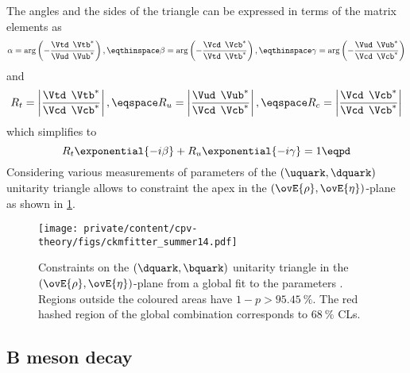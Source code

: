 The angles and the sides of the triangle can be expressed in terms of the matrix
elements as
%
\begin{equation}
  \alpha = \arg\left(-\frac{\Vtd^{\phantom{\ast}}\Vtb^{\ast}}{\Vud^{\phantom{\ast}}\Vub^{\ast}}\right),\eqthinspace 
  \beta =  \arg\left(-\frac{\Vcd^{\phantom{\ast}}\Vcb^{\ast}}{\Vtd^{\phantom{\ast}}\Vtb^{\ast}}\right),\eqthinspace 
  \gamma = \arg\left(-\frac{\Vud^{\phantom{\ast}}\Vub^{\ast}}{\Vcd^{\phantom{\ast}}\Vcb^{\ast}}\right)
\end{equation}
%
and
%
\begin{equation}
  R_t = \left| \frac{\Vtd^{\phantom{\ast}}\Vtb^{\ast}}{\Vcd^{\phantom{\ast}}\Vcb^{\ast}} \right|,\eqspace
  R_u = \left| \frac{\Vud^{\phantom{\ast}}\Vub^{\ast}}{\Vcd^{\phantom{\ast}}\Vcb^{\ast}} \right|,\eqspace
  R_c = \left| \frac{\Vcd^{\phantom{\ast}}\Vcb^{\ast}}{\Vcd^{\phantom{\ast}}\Vcb^{\ast}} \right|
\end{equation}
%
which simplifies to
%
\begin{equation}
  R_t \exponential{-i\beta} + R_u \exponential{-i\gamma} = 1 \eqpd
\end{equation}
%
Considering various measurements of parameters of the ${(\uquark,\dquark)}$
unitarity triangle allows to constraint the apex in the
${(\ovE{\rho},\ovE{\eta})}$-plane \cite{Charles:2004jd,Bona:2006ah} as shown in
\cref{fig:cpv_theory:flavour_physics:ckm_matrix:ckm_fitter_14}.

\begin{figure}[ht]
\centering
\texttt{[image: private/content/cpv-theory/figs/ckmfitter\_summer14.pdf]}
\caption{Constraints on the ${(\dquark,\bquark)}$ unitarity triangle in the
${(\ovE{\rho},\ovE{\eta})}$-plane from a global fit to the  \CKM parameters
\cite{Charles:2004jd}. Regions outside the coloured areas have $1-p >
\SI{95.45}{\percent}$. The red hashed region of the global combination
corresponds to $\SI{68}{\percent}$ \acp{CL}.}
\label{fig:cpv_theory:flavour_physics:ckm_matrix:ckm_fitter_14}
\end{figure}

\subsection{B meson decay}
\label{sec:cpv_theory:flavour_physics:bdecays}

